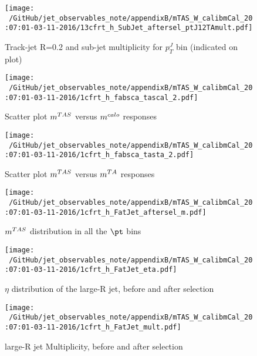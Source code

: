 \begin{figure}

\texttt{[image: ~/GitHub/jet\_observables\_note/appendixB/mTAS\_W\_calibmCal\_20:07:01-03-11-2016/13cfrt\_h\_SubJet\_aftersel\_ptJ12TAmult.pdf]}
\caption{Track-jet R=0.2 and sub-jet multiplicity for $p_{T}^{J}$ bin (indicated on plot) }

\end{figure}

\clearpage

\begin{figure}

\texttt{[image: ~/GitHub/jet\_observables\_note/appendixB/mTAS\_W\_calibmCal\_20:07:01-03-11-2016/1cfrt\_h\_fabsca\_tascal\_2.pdf]}
\caption{Scatter plot $m^{TAS}$ versus $m^{calo}$ responses}

\end{figure}
 
\begin{figure}
 
\texttt{[image: ~/GitHub/jet\_observables\_note/appendixB/mTAS\_W\_calibmCal\_20:07:01-03-11-2016/1cfrt\_h\_fabsca\_tasta\_2.pdf]}
\caption{Scatter plot $m^{TAS}$ versus $m^{TA}$ responses}
 
\end{figure}
 
\begin{figure}
 
\texttt{[image: ~/GitHub/jet\_observables\_note/appendixB/mTAS\_W\_calibmCal\_20:07:01-03-11-2016/1cfrt\_h\_FatJet\_aftersel\_m.pdf]}
\caption{$m^{TAS}$ distribution in all the $\pt$ bins}
 
\end{figure}
 
\begin{figure}
 
\texttt{[image: ~/GitHub/jet\_observables\_note/appendixB/mTAS\_W\_calibmCal\_20:07:01-03-11-2016/1cfrt\_h\_FatJet\_eta.pdf]}
\caption{$\eta$ distribution of the large-R jet, before and after selection}
 
\end{figure}

\begin{figure}
 
\texttt{[image: ~/GitHub/jet\_observables\_note/appendixB/mTAS\_W\_calibmCal\_20:07:01-03-11-2016/1cfrt\_h\_FatJet\_mult.pdf]}
\caption{large-R jet Multiplicity, before and after selection}
 
\end{figure}
 
